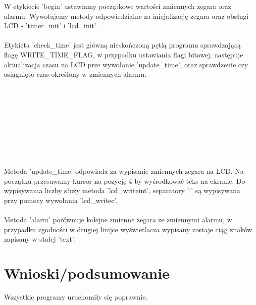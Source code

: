 \documentclass[12pt,a4paper]{article}
\begin{document}
		\begin{minipage}{.5\textwidth}
			
		\end{minipage}%
		\begin{minipage}{.5\textwidth}
			W etykiecie 'begin' ustawiamy początkowe wartości zmiennych zegara oraz alarmu. Wywołujemy metody
			odpowiedzialne za inicjalizację zegara oraz obsługi LCD - 'timer\_init' i 'lcd\_init'.\\\\
			Etykieta 'check\_time' jest główną nieskończoną pętlą programu sprawdzającą flagę WRITE\_TIME\_FLAG,
			w przypadku ustawiania flagi bitowej, następuje aktualizacja czasu na LCD prze wywołanie 'update\_time',
			oraz sprawdzenie czy osiągnięto czas określony w zmiennych alarmu.\\\\\\\\\\\\\\\\\\\\
			Metoda 'update\_time' odpowiada za wypisanie zmiennych zegara na LCD. Na początku przesuwamy kursor na
			pozycję 4 by wyśrodkować teks na ekranie. Do wypisywania liczby służy metoda 'lcd\_writeint', 
			separatory ':' są wypisywana przy pomocy wywołania 'lcd\_writec'.\\\\
			Metoda 'alarm' porównuje kolejne zmienne zegara ze zmiennymi alarmu, w przypadku zgodności w drugiej
			linijce wyświetlacza wypisany zostaje ciąg znaków zapisany w stałej 'text'.
		\end{minipage}
		
		\begin{minipage}{.5\textwidth}
			
		\end{minipage}%
		\begin{minipage}{.5\textwidth}
			
		\end{minipage}
		
		\begin{minipage}{.5\textwidth}
			
		\end{minipage}%
		\begin{minipage}{.5\textwidth}
			
		\end{minipage}

	\section{Wnioski/podsumowanie}
	
			Wszystkie programy uruchomiły się poprawnie.
	
\end{document}
